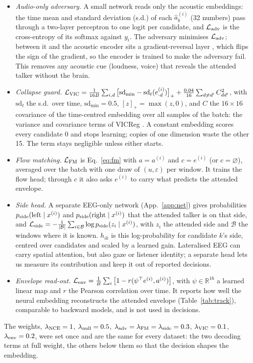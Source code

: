 \documentclass[10pt,twocolumn,letterpaper]{article}
\begin{document}
\begin{itemize}
\item \emph{Audio-only adversary.} A small network reads only the acoustic embeddings: the
time mean and standard deviation (s.d.) of each $\hat a^{(i)}_k$ (32 numbers) pass through a two-layer
perceptron to one logit per candidate, and $\mathcal L_{\rm adv}$ is the cross-entropy of its
softmax against $y_i$. The adversary minimises $\mathcal L_{\rm adv}$; between it and the
acoustic encoder sits a gradient-reversal layer \citep{ganin2016domain}, which flips the
sign of the gradient, so the encoder is trained to make the adversary fail. This removes
any acoustic cue (loudness, voice) that reveals the attended talker without the brain.
\item \emph{Collapse guard.} $\mathcal L_{\rm VIC}=\frac{1}{16B}\sum_{i,d}\big[\mathrm{sd}_{\min}-
\mathrm{sd}_t(e^{(i)}_{\cdot d})\big]_+ +\frac{0.04}{16}\sum_{d\neq d'}C_{dd'}^2$, with
$\mathrm{sd}_t$ the s.d.\ over time, $\mathrm{sd}_{\min}=0.5$,
$[z]_+=\max(z,0)$, and $C$ the $16\times16$ covariance of the time-centred embedding over
all samples of the batch: the variance and covariance terms of VICReg
\citep{bardes2022vicreg}. A constant embedding scores every candidate 0 and stops learning;
copies of one dimension waste the other 15. The term stays negligible unless either starts.
\item \emph{Flow matching.} $\mathcal L_{\rm FM}$ is Eq.~\ref{eq:fm} with $a=a^{(i)}$ and
$c=e^{(i)}$ (or $c=\varnothing$), averaged over the batch with one draw of $(u,\varepsilon)$
per window. It trains the flow head; through $c$ it also asks $e^{(i)}$ to carry what predicts
the attended envelope.
\item \emph{Side head.} A separate EEG-only network (App.~\ref{app:net}) gives probabilities
$p_{\rm side}(\text{left}\mid x^{(i)})$ and $p_{\rm side}(\text{right}\mid x^{(i)})$ that the
attended talker is on that side, and $\mathcal L_{\rm side}=-\frac{1}{|\mathcal B|}
\sum_{i\in\mathcal B}\log p_{\rm side}(z_i\mid x^{(i)})$, with $z_i$ the attended side and
$\mathcal B$ the windows where it is known. $h_{ik}$ is this log-probability for candidate
$k$'s side, centred over candidates and scaled by a learned gain. Lateralised EEG can carry
spatial attention, but also gaze or listener identity; a separate head lets us measure its
contribution and keep it out of reported decisions.
\item \emph{Envelope read-out.} $\mathcal L_{\rm env}=\frac1B\sum_i\big[1-r(\psi^\top
e^{(i)},a^{(i)})\big]$, with $\psi\in\mathbb R^{16}$ a learned linear map and $r$ the Pearson
correlation over time. It reports how well the neural embedding reconstructs the attended
envelope (Table~\ref{tab:track}), comparable to backward models, and is not used in decisions.
\end{itemize}
The weights, $\lambda_{\rm NCE}=1$, $\lambda_{\rm null}=0.5$,
$\lambda_{\rm adv}=\lambda_{\rm FM}=\lambda_{\rm side}=0.3$, $\lambda_{\rm VIC}=0.1$,
$\lambda_{\rm env}=0.2$, were set once and are the same for every dataset: the two decoding
terms at full weight, the others below them so that the decision shapes the embedding.
\end{document}
